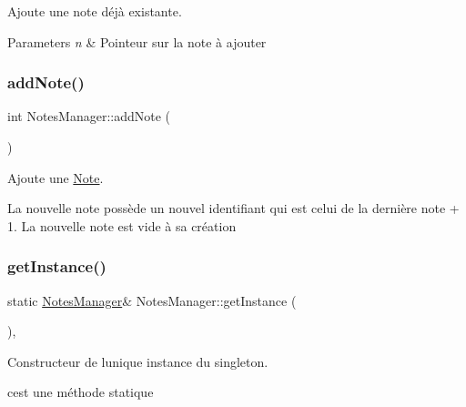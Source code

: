 Ajoute une note déjà existante. 


\begin{DoxyParams}{Parameters}
{\em n} & Pointeur sur la note à ajouter \\
\hline
\end{DoxyParams}
\mbox{\label{class_notes_manager_ac94f24bd2797edf14146d9caa1a50f36}} 
\subsubsection{\texorpdfstring{add\+Note()}{addNote()}}
{\footnotesize\ttfamily int Notes\+Manager\+::add\+Note (\begin{DoxyParamCaption}{ }\end{DoxyParamCaption})}



Ajoute une \hyperlink{class_note}{Note}. 

La nouvelle note possède un nouvel identifiant qui est celui de la dernière note + 1. La nouvelle note est vide à sa création \mbox{\label{class_notes_manager_a62868e66f00cf991822c7ffd5e751b31}} 
\subsubsection{\texorpdfstring{get\+Instance()}{getInstance()}}
{\footnotesize\ttfamily static \hyperlink{class_notes_manager}{Notes\+Manager}\& Notes\+Manager\+::get\+Instance (\begin{DoxyParamCaption}{ }\end{DoxyParamCaption})\hspace{0.3cm}{\ttfamily [inline]}, {\ttfamily [static]}}



Constructeur de l\textquotesingle{}unique instance du singleton. 

c\textquotesingle{}est une méthode statique \mbox{\label{class_notes_manager_a423e040490fa4a8244acd90c754fe7b5}} 
